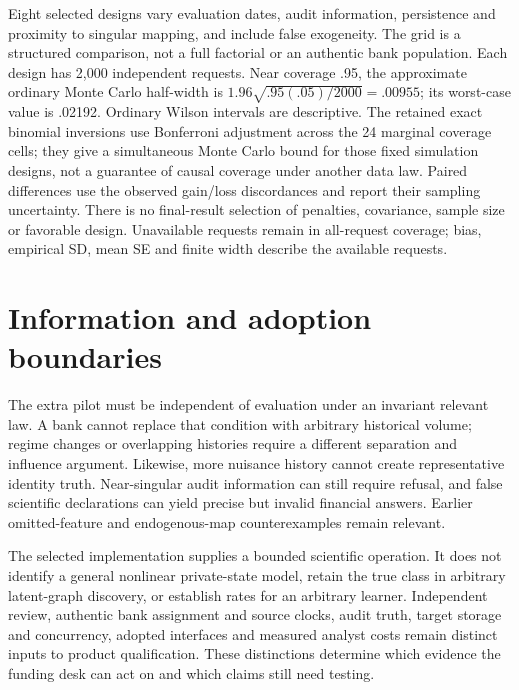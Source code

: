 Eight selected designs vary evaluation dates, audit information, persistence
and proximity to singular mapping, and include false exogeneity. The grid is
a structured comparison, not a full factorial or an authentic bank population.
Each design has 2,000 independent requests. Near coverage .95, the approximate
ordinary Monte Carlo half-width is
$1.96\sqrt{.95(.05)/2000}=.00955$; its worst-case value is .02192. Ordinary
Wilson intervals are descriptive. The retained exact binomial inversions use
Bonferroni adjustment across the 24 marginal coverage cells; they give a
simultaneous Monte Carlo bound for those fixed simulation designs, not a
guarantee of causal coverage under another data law. Paired differences use
the observed gain/loss discordances and report their sampling uncertainty.
There is no final-result selection of penalties, covariance, sample size or
favorable design. Unavailable requests remain in all-request coverage; bias,
empirical SD, mean SE and finite width describe the available requests.



\section{Information and adoption boundaries}
\label{v10:limits}

The extra pilot must be independent of evaluation under an invariant relevant
law. A bank cannot replace that condition with arbitrary historical volume;
regime changes or overlapping histories require a different separation and
influence argument. Likewise, more nuisance history cannot create representative
identity truth. Near-singular audit information can still require refusal, and
false scientific declarations can yield precise but invalid financial answers.
Earlier omitted-feature and endogenous-map counterexamples remain relevant.

The selected implementation supplies a bounded scientific operation. It does
not identify a general nonlinear private-state model, retain the true class in
arbitrary latent-graph discovery, or establish rates for an arbitrary learner.
Independent review, authentic bank assignment and source clocks, audit truth,
target storage and concurrency, adopted interfaces and measured analyst costs
remain distinct inputs to product qualification. These distinctions determine
which evidence the funding desk can act on and which claims still need testing.
